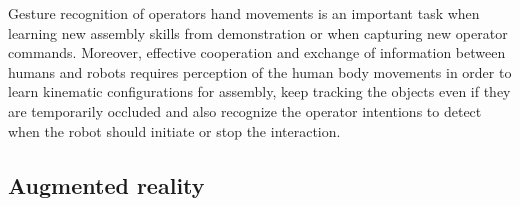 Gesture recognition of operators hand movements \cite{Oikonomidis2012,Gleeson2013} is an important task when learning new assembly skills from demonstration \cite{Nikolaidis2013} or when capturing new operator commands. Moreover, effective cooperation \cite{Adorno2011} and exchange of information between humans and robots \cite{Pandey2012,Putz2014} requires perception of the human body movements \cite{Roitberg2014} in order to learn kinematic configurations for assembly, keep tracking the objects even if they are temporarily occluded and also recognize the operator intentions to detect when the robot should initiate or stop the interaction.


%




\subsection{Augmented reality}

